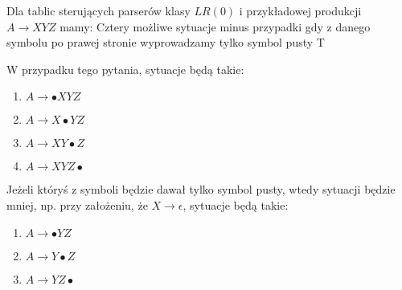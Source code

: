 \answer
{Dla tablic sterujących parserów klasy $LR(0)$ i przykładowej produkcji $A \rightarrow XYZ$ mamy:}
{Cztery możliwe sytuacje minus przypadki gdy z danego symbolu po prawej stronie wyprowadzamy tylko symbol pusty}
{T}
{W przypadku tego pytania, sytuacje będą takie:
\begin{enumerate}
\item $A \rightarrow \bullet XYZ$
\item $A \rightarrow X\bullet YZ$
\item $A \rightarrow XY\bullet Z$
\item $A \rightarrow XYZ\bullet$
\end{enumerate}
Jeżeli któryś z symboli będzie dawał tylko symbol pusty, wtedy sytuacji będzie mniej, np. przy założeniu, że $X \rightarrow \epsilon$, sytuacje będą takie:
\begin{enumerate}
\item $A \rightarrow \bullet YZ$
\item $A \rightarrow Y\bullet Z$
\item $A \rightarrow YZ\bullet$
\end{enumerate}
}
{}


